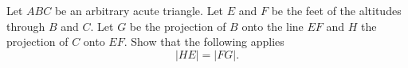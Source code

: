 Let $ABC$ be an arbitrary acute triangle.
Let $E$ and $F$ be the feet of the altitudes through $B$ and $C$.
Let $G$ be the projection of $B$ onto the line $EF$ and $H$ the projection of $C$ onto $EF$.
Show that the following applies
$$|HE|=|FG|.$$